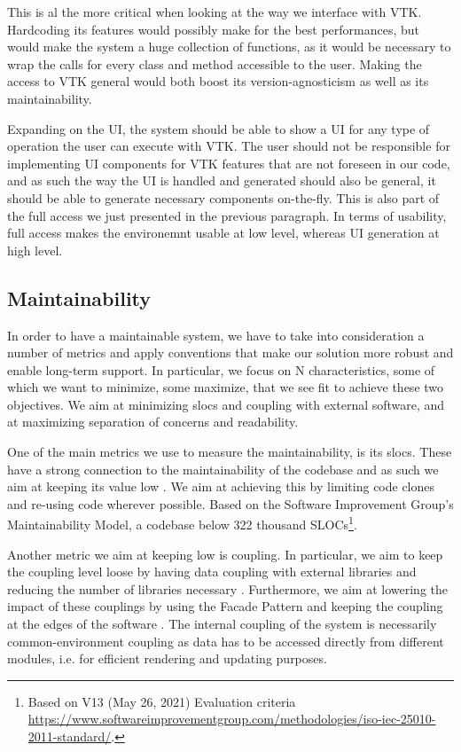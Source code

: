 This is al the more critical when looking at the way we interface with VTK. Hardcoding its features would possibly make for the best performances, but would make the system a huge collection of functions, as it would be necessary to wrap the calls for every class and method accessible to the user. Making the access to VTK general would both boost its version-agnosticism as well as its maintainability.

Expanding on the UI, the system should be able to show a UI for any type of operation the user can execute with VTK. The user should not be responsible for implementing UI components for VTK features that are not foreseen in our code, and as such the way the UI is handled and generated should also be general, it should be able to generate necessary components on-the-fly. This is also part of the full access we just presented in the previous paragraph. In terms of usability, full access makes the environemnt usable at low level, whereas UI generation at high level.

\subsection{Maintainability}

In order to have a maintainable system, we have to take into consideration a number of metrics and apply conventions that make our solution more robust and enable long-term support. In particular, we focus on N characteristics, some of which we want to minimize, some maximize, that we see fit to achieve these two objectives. We aim at minimizing \acrfull{slocs} and coupling with external software, and at maximizing separation of concerns and readability.

One of the main metrics we use to measure the maintainability, is its \acrlong{slocs}. These have a strong connection to the maintainability of the codebase and as such we aim at keeping its value low \cite{4335232}. We aim at achieving this by limiting code clones and re-using code wherever possible. Based on the Software Improvement Group's Maintainability Model, a codebase below 322 thousand SLOCs\footnote{Based on V13 (May 26, 2021) Evaluation criteria \url{https://www.softwareimprovementgroup.com/methodologies/iso-iec-25010-2011-standard/}.}.

Another metric we aim at keeping low is coupling. In particular, we aim to keep the coupling level loose by having data coupling with external libraries and reducing the number of libraries necessary \cite{8016712}. Furthermore, we aim at lowering the impact of these couplings by using the Facade Pattern and keeping the coupling at the edges of the software \cite{alma990009471180205131}. The internal coupling of the system is necessarily common-environment coupling as data has to be accessed directly from different modules, i.e. for efficient rendering and updating purposes.


